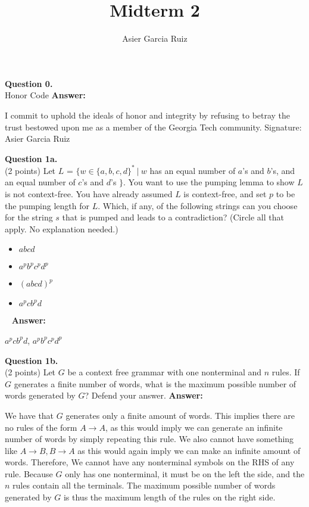 \documentclass{article}
\title{Midterm 2}
\author{Asier Garcia Ruiz}
\newenvironment{question}[2]
{
    {\large \textbf{Question #1.}}\\
    #2 \newline\newline
    \textbf{Answer:}
}{}{\newpage}
\begin{document}
\maketitle

\begin{question}
    {0}
    {Honor Code}
    I commit to uphold the ideals of honor and integrity by refusing to betray the trust bestowed upon me as a member of the Georgia Tech community.
    Signature: Asier Garcia Ruiz
\end{question}

\begin{question}
    {1a}
    {(2 points) Let $L$ = $\{w \in \{a,b,c,d\}^* \ |\ w$ has an equal number of
        $a$'s and $b$'s, and an equal number of $c$'s and $d$'s $\}$. You want to use the
        pumping lemma to show $L$ is not context-free. You have already assumed $L$ is
        context-free, and set $p$ to be the pumping length for $L$. Which, if any, of the
        following strings can you choose for the string $s$ that is pumped and leads to a
        contradiction? (Circle all that apply. No explanation needed.)

        \begin{multicols}{2}
            \begin{itemize}
                \item $abcd$
                \item $a^pb^pc^pd^p$
                \item $(abcd)^p$
                \item $a^pcb^pd$
            \end{itemize}
        \end{multicols}
        \
    }

    $a^pcb^pd$, $a^pb^pc^pd^p$
\end{question}

\begin{question}
    {1b}
    {(2 points) Let $G$ be a context free grammar with one nonterminal and $n$
        rules. If $G$ generates a finite number of words, what is the maximum possible
        number of words generated by $G$? Defend your answer.}
    We have that $G$ generates only a finite amount of words. This implies there are no rules of the form $A \to A$, as this would imply
    we can generate an infinite number of words by simply repeating this rule. We also cannot have something like $A \to B, B \to A$ as this
    would again imply we can make an infinite amount of words. Therefore, We cannot have any nonterminal symbols on the RHS of any rule.
    Because $G$ only has one nonterminal, it must be on the left the side, and the $n$ rules contain all the terminals. The maximum possible
    number of words generated by $G$ is thus the maximum length of the rules on the right side.
\end{question}
\end{document}
